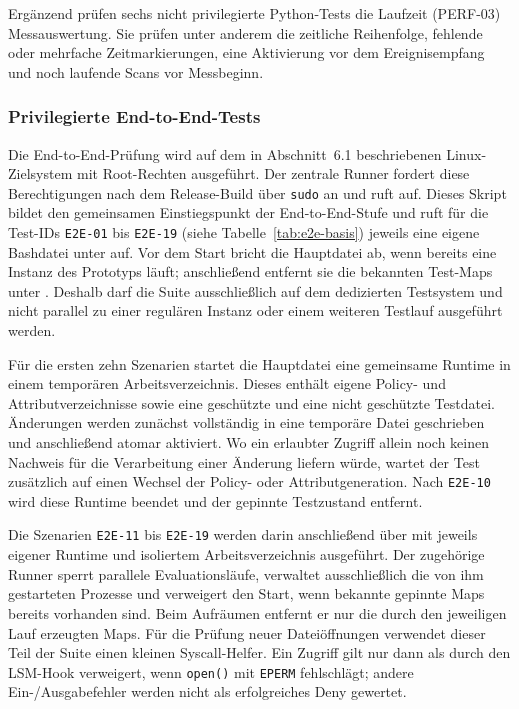 Ergänzend prüfen sechs nicht privilegierte Python-Tests die Laufzeit (PERF-03) Messauswertung. Sie prüfen
unter anderem die zeitliche Reihenfolge, fehlende oder mehrfache Zeitmarkierungen,
eine Aktivierung vor dem Ereignisempfang und noch laufende Scans vor Messbeginn.

\subsubsection{Privilegierte End-to-End-Tests}

Die End-to-End-Prüfung wird auf dem in Abschnitt~6.1 beschriebenen Linux-Zielsystem mit
Root-Rechten ausgeführt. Der zentrale Runner  fordert diese Berechtigungen nach dem
Release-Build über \texttt{sudo} an und ruft  auf. Dieses Skript bildet den
gemeinsamen Einstiegspunkt der End-to-End-Stufe und
ruft für die Test-IDs \texttt{E2E-01} bis \texttt{E2E-19} (siehe Tabelle~\ref{tab:e2e-basis}) jeweils eine eigene Bashdatei unter
 auf. Vor dem Start bricht die Hauptdatei ab, wenn bereits eine Instanz des
Prototyps läuft; anschließend entfernt sie die bekannten Test-Maps unter
. Deshalb darf die Suite ausschließlich auf dem dedizierten Testsystem
und nicht parallel zu einer regulären Instanz oder einem weiteren Testlauf ausgeführt werden.

Für die ersten zehn Szenarien startet die Hauptdatei eine gemeinsame Runtime in einem temporären
Arbeitsverzeichnis. Dieses enthält eigene Policy- und Attributverzeichnisse sowie eine geschützte
und eine nicht geschützte Testdatei. Änderungen werden zunächst vollständig in eine temporäre
Datei geschrieben und anschließend atomar aktiviert. Wo ein erlaubter Zugriff allein noch keinen
Nachweis für die Verarbeitung einer Änderung liefern würde, wartet der Test zusätzlich auf einen
Wechsel der Policy- oder Attributgeneration. Nach \texttt{E2E-10} wird diese Runtime beendet und
der gepinnte Testzustand entfernt.

Die Szenarien \texttt{E2E-11} bis \texttt{E2E-19} werden darin anschließend über
 mit jeweils eigener Runtime und isoliertem Arbeitsverzeichnis
ausgeführt. Der zugehörige Runner sperrt parallele Evaluationsläufe, verwaltet ausschließlich die
von ihm gestarteten Prozesse und verweigert den Start, wenn bekannte gepinnte Maps bereits
vorhanden sind. Beim Aufräumen entfernt er nur die durch den jeweiligen Lauf erzeugten Maps. Für
die Prüfung neuer Dateiöffnungen verwendet dieser Teil der Suite einen kleinen Syscall-Helfer. Ein
Zugriff gilt nur dann als durch den LSM-Hook verweigert, wenn \texttt{open()} mit \texttt{EPERM}
fehlschlägt; andere Ein-/Ausgabefehler werden nicht als erfolgreiches Deny gewertet.

